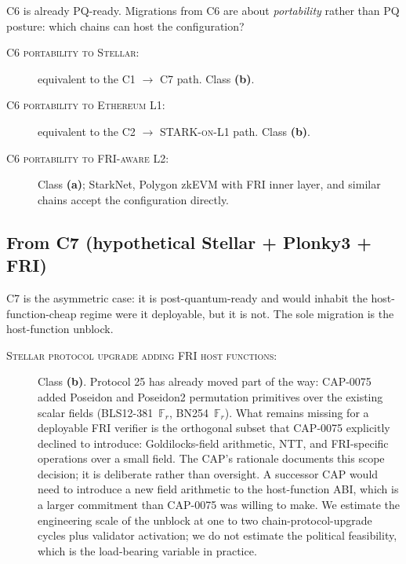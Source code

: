 C6 is already PQ-ready. Migrations from C6 are about
\emph{portability} rather than PQ posture: which chains can host the
configuration?

\begin{description}
  \item[\textsc{C6 portability to Stellar}:] equivalent to the
    \textsc{C1 $\to$ C7} path. Class \textbf{(b)}.
  \item[\textsc{C6 portability to Ethereum L1}:] equivalent to the
    \textsc{C2 $\to$ STARK-on-L1} path. Class \textbf{(b)}.
  \item[\textsc{C6 portability to FRI-aware L2}:] Class \textbf{(a)};
    StarkNet, Polygon zkEVM with FRI inner layer, and similar chains
    accept the configuration directly.
\end{description}

\subsection{From C7 (hypothetical Stellar + Plonky3 + FRI)}
\label{sec:mig-c7}

C7 is the asymmetric case: it is post-quantum-ready and would inhabit
the host-function-cheap regime were it deployable, but it is not. The
sole migration is the host-function unblock.

\begin{description}
  \item[\textsc{Stellar protocol upgrade adding FRI host functions}:]
    Class \textbf{(b)}. Protocol 25 has already moved part of the
    way: CAP-0075~\cite{stellar-cap-0075} added Poseidon and
    Poseidon2 permutation primitives over the existing scalar fields
    (BLS12-381~$\mathbb{F}_r$, BN254~$\mathbb{F}_r$). What remains
    missing for a deployable FRI verifier is the orthogonal subset
    that CAP-0075 explicitly declined to introduce: Goldilocks-field
    arithmetic, NTT, and FRI-specific operations over a small field.
    The CAP's rationale documents this scope decision; it is
    deliberate rather than oversight. A successor CAP would need to
    introduce a new field arithmetic to the host-function ABI, which
    is a larger commitment than CAP-0075 was willing to make. We
    estimate the engineering scale of the unblock at one to two
    chain-protocol-upgrade cycles plus validator activation; we do
    not estimate the political feasibility, which is the
    load-bearing variable in practice.
\end{description}


